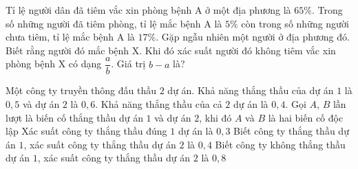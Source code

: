 \begin{bt}%

Tỉ lệ người dân đã tiêm vắc xin phòng bệnh A ở một địa phương là $65\%$. Trong số những  người đã tiêm phòng, tỉ lệ mắc bệnh A là $5\%$ còn trong số những người chưa tiêm, tỉ lệ mắc bệnh A là $17\%$. Gặp ngẫu nhiên một người ở địa phương đó. Biết rằng người đó mắc bệnh X. Khi đó xác suất người đó không tiêm vắc xin phòng bệnh X có dạng $\dfrac{a}{b}$. Giá trị $b-a$ là?
\end{bt}

\begin{ex}%
	Một công ty truyền thông đấu thầu $2$ dự án. Khả năng thắng thầu của dự án $1$ là $0{,}5$ và dự án $2$ là $0{,}6$. Khả năng thắng thầu của cả $2$ dự án là $0{,}4$. Gọi $A$, $B$ lần lượt là biến cố thắng thầu dự án $1$ và dự án $2$, khi đó
	\choiceTF
	{$A$ và $B$ là hai biến cố độc lập}
	{\True Xác suất công ty thắng thầu đúng $1$ dự án là $0{,}3$}
	{Biết công ty thắng thầu dự án $1$, xác suất công ty thắng thầu dự án $2$ là $0{,}4$}
	{Biết công ty không thắng thầu dự án $1$, xác suất công ty thắng thầu dự án $2$ là $0{,}8$}
\end{ex}

